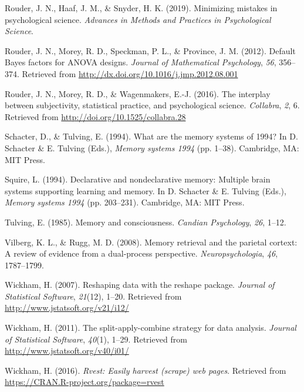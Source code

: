 \documentclass[english,,man]{apa6}
\begin{document}
\leavevmode\hypertarget{ref-Rouder:etal:2019a}{}%
Rouder, J. N., Haaf, J. M., \& Snyder, H. K. (2019). Minimizing mistakes in psychological science. \emph{Advances in Methods and Practices in Psychological Science}.

\leavevmode\hypertarget{ref-Rouder:etal:2012}{}%
Rouder, J. N., Morey, R. D., Speckman, P. L., \& Province, J. M. (2012). Default Bayes factors for ANOVA designs. \emph{Journal of Mathematical Psychology}, \emph{56}, 356--374. Retrieved from \url{http://dx.doi.org/10.1016/j.jmp.2012.08.001}

\leavevmode\hypertarget{ref-Rouder:etal:2016b}{}%
Rouder, J. N., Morey, R. D., \& Wagenmakers, E.-J. (2016). The interplay between subjectivity, statistical practice, and psychological science. \emph{Collabra}, \emph{2}, 6. Retrieved from \url{http://doi.org/10.1525/collabra.28}

\leavevmode\hypertarget{ref-Schacter:Tulving:1994}{}%
Schacter, D., \& Tulving, E. (1994). What are the memory systems of 1994? In D. Schacter \& E. Tulving (Eds.), \emph{Memory systems 1994} (pp. 1--38). Cambridge, MA: MIT Press.

\leavevmode\hypertarget{ref-Squire:1994}{}%
Squire, L. (1994). Declarative and nondeclarative memory: Multiple brain systems supporting learning and memory. In D. Schacter \& E. Tulving (Eds.), \emph{Memory systems 1994} (pp. 203--231). Cambridge, MA: MIT Press.

\leavevmode\hypertarget{ref-Tulving:1985}{}%
Tulving, E. (1985). Memory and consciousness. \emph{Candian Psychology}, \emph{26}, 1--12.

\leavevmode\hypertarget{ref-Vilberg:Rugg:2008}{}%
Vilberg, K. L., \& Rugg, M. D. (2008). Memory retrieval and the parietal cortext: A review of evidence from a dual-process perspective. \emph{Neuropsychologia}, \emph{46}, 1787--1799.

\leavevmode\hypertarget{ref-R-reshape2}{}%
Wickham, H. (2007). Reshaping data with the reshape package. \emph{Journal of Statistical Software}, \emph{21}(12), 1--20. Retrieved from \url{http://www.jstatsoft.org/v21/i12/}

\leavevmode\hypertarget{ref-R-plyr}{}%
Wickham, H. (2011). The split-apply-combine strategy for data analysis. \emph{Journal of Statistical Software}, \emph{40}(1), 1--29. Retrieved from \url{http://www.jstatsoft.org/v40/i01/}

\leavevmode\hypertarget{ref-R-rvest}{}%
Wickham, H. (2016). \emph{Rvest: Easily harvest (scrape) web pages}. Retrieved from \url{https://CRAN.R-project.org/package=rvest}
\end{document}
